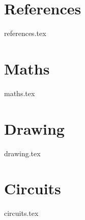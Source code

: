 \chapter{References}
    {references.tex}
\chapter{Maths}
    {maths.tex}
\chapter{Drawing}
    {drawing.tex}
\chapter{Circuits}
    {circuits.tex}